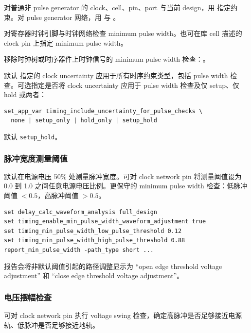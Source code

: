 对普通非 pulse generator 的 clock、cell、pin、port 与当前 design，用  指定约束。对 pulse generator 网络，用  与 。

\begin{noteBox}
 对寄存器时钟引脚与时钟网络检查 minimum pulse width。也可在库 cell 描述的 clock pin 上指定 minimum pulse width。
\end{noteBox}

移除时钟树或时序器件上时钟信号的 minimum pulse width 检查：。

默认  指定的 clock uncertainty 应用于所有时序约束类型，包括 pulse width 检查。可选指定是否将 clock uncertainty 应用于 pulse width 检查及仅 setup、仅 hold 或两者：
\begin{lstlisting}
set_app_var timing_include_uncertainty_for_pulse_checks \
  none | setup_only | hold_only | setup_hold
\end{lstlisting}
默认 \texttt{setup\_hold}。

\subsubsection{脉冲宽度测量阈值}
默认在电源电压 50\% 处测量脉冲宽度。可对 clock network pin 将测量阈值设为 0.0 到 1.0 之间任意电源电压比例。更保守的 minimum pulse width 检查：低脉冲阈值 $< 0.5$，高脉冲阈值 $> 0.5$。

\begin{lstlisting}
set delay_calc_waveform_analysis full_design
set timing_enable_min_pulse_width_waveform_adjustment true
set timing_min_pulse_width_low_pulse_threshold 0.12
set timing_min_pulse_width_high_pulse_threshold 0.88
report_min_pulse_width -path_type short ...
\end{lstlisting}

 报告会将非默认阈值引起的路径调整显示为 ``open edge threshold voltage adjustment'' 和 ``close edge threshold voltage adjustment''。


\subsubsection{电压摆幅检查}
可对 clock network pin 执行 voltage swing 检查，确定高脉冲是否足够接近电源轨、低脉冲是否足够接近地轨。

